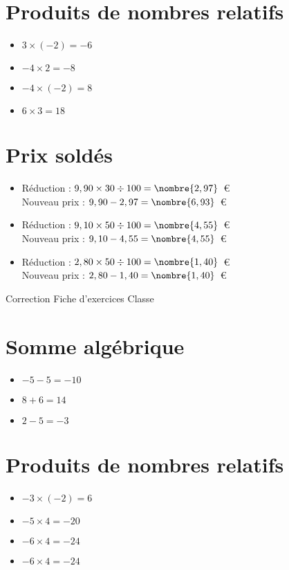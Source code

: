 \documentclass[a4paper,11pt,fleqn]{article}
\begin{document}
\section{Produits de nombres relatifs}
\begin{itemize}

  \item $3\times(-2)=-6$
  \item $-4\times2=-8$
  \item $-4\times(-2)=8$
  \item $6\times3=18$
\end{itemize}

\section{Prix soldés}
\begin{itemize}

  \item Réduction : $9,90\times30\div100=\nombre{2,97}$~€\\
  Nouveau prix : $9,90-2,97=\nombre{6,93}$~€
  \item Réduction : $9,10\times50\div100=\nombre{4,55}$~€\\
  Nouveau prix : $9,10-4,55=\nombre{4,55}$~€
  \item Réduction : $2,80\times50\div100=\nombre{1,40}$~€\\
  Nouveau prix : $2,80-1,40=\nombre{1,40}$~€
\end{itemize}
\newpage
\setcounter{exo}{0}
\setcounter{section}{0}
{Correction} \hfill {\huge Fiche d'exercices } \hfill {Classe}

\section{Somme algébrique}
\begin{itemize}

  \item $-5 -5=-10$
  \item $8 +6=14$
  \item $2 -5=-3$
\end{itemize}

\section{Produits de nombres relatifs}
\begin{itemize}

  \item $-3\times(-2)=6$
  \item $-5\times4=-20$
  \item $-6\times4=-24$
  \item $-6\times4=-24$
\end{itemize}
\end{document}
